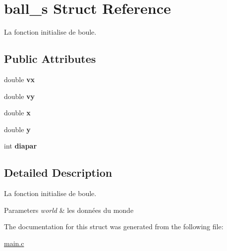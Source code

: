 \hypertarget{structball__s}{\section{ball\-\_\-s Struct Reference}
\label{structball__s}
}


La fonction initialise de boule.  


\subsection*{Public Attributes}
\begin{DoxyCompactItemize}
\item 
\hypertarget{structball__s_a715881bcf5420f98dac1899b0c6af0b6}{double {\bfseries vx}}\label{structball__s_a715881bcf5420f98dac1899b0c6af0b6}

\item 
\hypertarget{structball__s_ae3430263557bdd1969ed50c6af37647a}{double {\bfseries vy}}\label{structball__s_ae3430263557bdd1969ed50c6af37647a}

\item 
\hypertarget{structball__s_a8d2342c7c3c48faadb16d9e1ae8d48ad}{double {\bfseries x}}\label{structball__s_a8d2342c7c3c48faadb16d9e1ae8d48ad}

\item 
\hypertarget{structball__s_ae2a3d07e84e190a1ce16abba2189ec67}{double {\bfseries y}}\label{structball__s_ae2a3d07e84e190a1ce16abba2189ec67}

\item 
\hypertarget{structball__s_a825961f17893f49a942a06b19c28b4a6}{int {\bfseries diapar}}\label{structball__s_a825961f17893f49a942a06b19c28b4a6}

\end{DoxyCompactItemize}


\subsection{Detailed Description}
La fonction initialise de boule. 


\begin{DoxyParams}{Parameters}
{\em world} & les données du monde \\
\hline
\end{DoxyParams}


The documentation for this struct was generated from the following file\-:\begin{DoxyCompactItemize}
\item 
\hyperlink{main_8c}{main.\-c}\end{DoxyCompactItemize}
